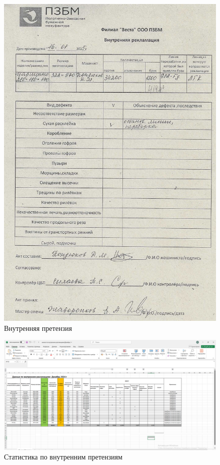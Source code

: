 \begin{figure}
\begin{center}
 \includegraphics[height=0.9\textheight, keepaspectratio]{Pics/VIII.11.jpg}
\end{center}
 \caption{Внутренняя претензия}
 \label{pic:/VIII.11}
\end{figure}

\begin{figure}
\begin{center}
 \includegraphics[height=0.35\textheight, keepaspectratio]{Pics/VIIIвнпретензии.png}
\end{center}
 \caption{Статистика по внутренним претензиям}
 \label{pic:/VIIIвнпретензии}
\end{figure}

